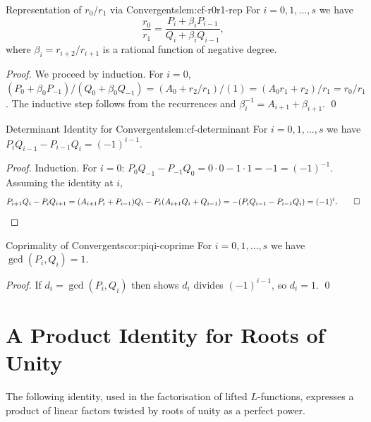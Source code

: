 \begin{lemma}{Representation of $r_0/r_1$ via Convergents}{lem:cf-r0r1-rep}
  For $i=0,1,\dots,s$ we have
  $$\frac{r_0}{r_1}=\frac{P_i+\beta_i P_{i-1}}{Q_i+\beta_i Q_{i-1}},$$
  where $\beta_i=r_{i+2}/r_{i+1}$ is a rational function of negative degree.
\end{lemma}
\begin{proof}
  We proceed by induction. For $i=0$, $(P_0+\beta_0P_{-1})/(Q_0+\beta_0Q_{-1})=(A_0+r_2/r_1)/(1)=(A_0r_1+r_2)/r_1=r_0/r_1$. The inductive step follows from the recurrences and $\beta_i^{-1}=A_{i+1}+\beta_{i+1}$. \qed
\end{proof}

\begin{lemma}{Determinant Identity for Convergents}{lem:cf-determinant}
  For $i=0,1,\dots,s$ we have $P_iQ_{i-1}-P_{i-1}Q_i=(-1)^{i-1}$.
\end{lemma}
\begin{proof}
  Induction. For $i=0$: $P_0Q_{-1}-P_{-1}Q_0=0\cdot 0-1\cdot 1=-1=(-1)^{-1}$. Assuming the identity at $i$,
  $$P_{i+1}Q_i-P_iQ_{i+1}=(A_{i+1}P_i+P_{i-1})Q_i-P_i(A_{i+1}Q_i+Q_{i-1})=-(P_iQ_{i-1}-P_{i-1}Q_i)=(-1)^i. \qed$$
\end{proof}

\begin{corolary}{Coprimality of Convergents}{cor:piqi-coprime}
  For $i=0,1,\dots,s$ we have $\gcd(P_i,Q_i)=1$.
\end{corolary}
\begin{proof}
  If $d_i=\gcd(P_i,Q_i)$ then  shows $d_i$ divides $(-1)^{i-1}$, so $d_i=1$. \qed
\end{proof}

\section{A Product Identity for Roots of Unity}

The following identity, used in the factorisation of lifted $L$-functions, expresses a product of linear factors twisted by roots of unity as a perfect power.

